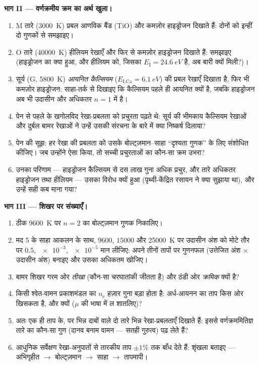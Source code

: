 \begin{problem}[{सप्ताहांत समस्या --- साहा, पेन, और ब्रह्मांड
किससे बना है}]
\medskip\noindent\textbf{भाग II --- वर्णक्रमीय क्रम का अर्थ
खुला।}
\begin{enumerate}[resume]
  \item M तारे (\qty{3000}{K}) प्रबल आणविक बैंड (TiO) और कमज़ोर
        हाइड्रोजन दिखाते हैं: दोनों को इन्हीं दो गुणकों से समझाइए।
  \item O तारे (\qty{40000}{K}) हीलियम रेखाएँ और फिर से कमज़ोर
        हाइड्रोजन दिखाते हैं: समझाइए (हाइड्रोजन का क्या हुआ, और
        हीलियम को, जिसका $E_{\text{I}} = \qty{24.6}{eV}$ है, अब
        बारी क्यों मिली?)।
  \item सूर्य (G, \qty{5800}{K}) \emph{आयनित कैल्सियम}
        ($E_{\text{I,Ca}} = \qty{6.1}{eV}$) की प्रबल रेखाएँ दिखाता
        है, फिर भी कमज़ोर हाइड्रोजन: साहा-तर्क से दिखाइए कि
        कैल्सियम पहले ही आयनित क्यों है, जबकि हाइड्रोजन अब भी
        उदासीन और अधिकतर $n = 1$ में है।
  \item पेन से पहले के खगोलविद रेखा-प्रबलता को प्रचुरता पढ़ते थे:
        सूर्य की भीमकाय कैल्सियम रेखाओं और दुर्बल बामर रेखाओं ने
        उन्हें उसकी संरचना के बारे में क्या निष्कर्ष दिलाया?
  \item पेन की सूझ: हर रेखा की प्रबलता को उसके बोल्ट्ज़मान--साहा
        ``दृश्यता गुणक'' के लिए संशोधित कीजिए। जब उन्होंने ऐसा
        किया, तो सच्ची प्रचुरताओं का कौन-सा क्रम उभरा?
  \item उनका परिणाम --- हाइड्रोजन कैल्सियम से दस लाख गुना अधिक
        प्रचुर, और तारे अधिकतर हाइड्रोजन तथा हीलियम --- उसका विरोध
        क्यों हुआ (पृथ्वी-केंद्रित रसायन ने क्या सुझाया था), और
        उन्हें सही कब माना गया?
\end{enumerate}

\medskip\noindent\textbf{भाग III --- शिखर पर संख्याएँ।}
\begin{enumerate}[resume]
  \item ठीक \qty{9600}{K} पर $n = 2$ का बोल्ट्ज़मान गुणक
        निकालिए।
  \item मद 5 के साहा आकलन के साथ, $9600$, $15000$ और \qty{25000}{K}
        पर उदासीन अंश को मोटे तौर पर $0.5$, $\num{e-3}$,
        $\num{e-5}$ मान लीजिए: अपने तीनों तापों पर गुणनफल
        (उत्तेजित अंश $\times$ उदासीन अंश) बनाइए और उसका अधिकतम
        खोजिए।
  \item बामर शिखर गरम ओर \emph{तीखा} (कौन-सा चरघातांकी जीतता है)
        और ठंडी ओर \emph{क्रमिक} क्यों है?
  \item किसी श्वेत-वामन प्रकाशमंडल का $n_{\text{e}}$ हज़ार गुना
        बड़ा होता है: अर्ध-आयनन का ताप किस ओर खिसकता है, और क्यों
        ($\mu$ की भाषा में ल शातलिए)?
  \item अतः एक ही ताप के, पर भिन्न दाबों वाले दो तारे भिन्न
        रेखा-प्रबलताएँ दिखाते हैं: इससे वर्णक्रममितिज्ञ तारे का
        कौन-सा गुण (दानव बनाम वामन --- सतही गुरुत्व) पढ़ लेते हैं?
  \item आधुनिक सर्वेक्षण रेखा-अनुपातों से तारकीय ताप $\pm1\%$ तक
        बाँध देते हैं: शृंखला बताइए --- अभिगृहीत $\to$ बोल्ट्ज़मान
        $\to$ साहा $\to$ तापमापी।
\end{enumerate}


\end{problem}
